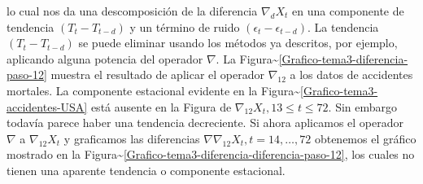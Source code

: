 \documentclass[12pt,]{krantz}
\theoremstyle{definition}
\theoremstyle{definition}
\theoremstyle{definition}
\theoremstyle{remark}
\begin{document}
lo cual nos da una descomposición de la diferencia \(\nabla_dX_t\) en
una componente de tendencia \((T_t-T_{t-d})\) y un término de ruido
\((\epsilon_t-\epsilon_{t-d})\). La tendencia \((T_t-T_{t-d})\) se puede
eliminar usando los métodos ya descritos, por ejemplo, aplicando alguna
potencia del operador \(\nabla\). La
Figura\textasciitilde{}\ref{Grafico-tema3-diferencia-paso-12} muestra el
resultado de aplicar el operador \(\nabla_{12}\) a los datos de
accidentes mortales. La componente estacional evidente en la
Figura\textasciitilde{}\ref{Grafico-tema3-accidentes-USA} está ausente
en la Figura de \(\nabla_{12}X_t,13\leq t\leq72\). Sin embargo todavía
parece haber una tendencia decreciente. Si ahora aplicamos el operador
\(\nabla\) a \(\nabla_{12}X_t\) y graficamos las diferencias
\(\nabla\nabla_{12}X_t,t=14,\ldots,72\) obtenemos el gráfico mostrado en
la
Figura\textasciitilde{}\ref{Grafico-tema3-diferencia-diferencia-paso-12},
los cuales no tienen una aparente tendencia o componente estacional.

\cleardoublepage 

\appendix {}




\backmatter
\printindex
\end{document}
